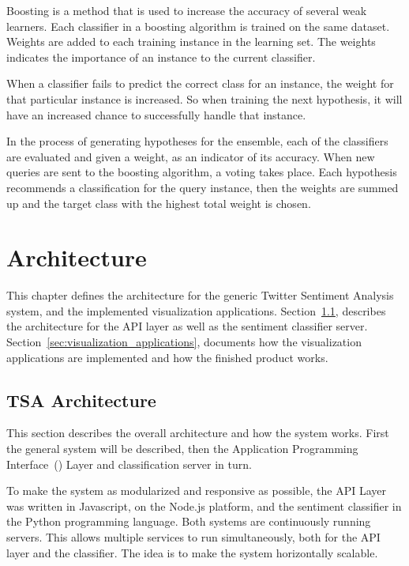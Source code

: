Boosting is a method that is used to increase the accuracy of several weak learners. Each classifier in a boosting algorithm is trained on the same dataset. Weights are added to each training instance in the learning set. The weights indicates the importance of an instance to the current classifier. 

When a classifier fails to predict the correct class for an instance, the weight for that particular instance is increased. So when training the next hypothesis, it will have an increased chance to successfully handle that instance.

In the process of generating hypotheses for the ensemble, each of the classifiers are evaluated and given a weight, as an indicator of its accuracy. When new queries are sent to the boosting algorithm, a voting takes place. Each hypothesis recommends a classification for the query instance, then the weights are summed up and the target class with the highest total weight is chosen.

\chapter{Architecture}
\label{sec:experimentalsetup}

This chapter defines the architecture for the generic Twitter Sentiment Analysis system, and the implemented visualization applications. Section~\ref{sec:tsaarchitecture}, describes the architecture for the API layer as well as the sentiment classifier server. Section~\ref{sec:visualization_applications}, documents how the visualization applications are implemented and how the finished product works.

\section{TSA Architecture}
\label{sec:tsaarchitecture}

This section describes the overall architecture and how the system works. First the general system will be described, then the Application Programming Interface~() Layer and classification server in turn.  

To make the system as modularized and responsive as possible, the API Layer was written in Javascript, on the Node.js platform, and the sentiment classifier in the Python programming language. Both systems are continuously running servers. This allows multiple services to run simultaneously, both for the API layer and the classifier. The idea is to make the system horizontally scalable.

